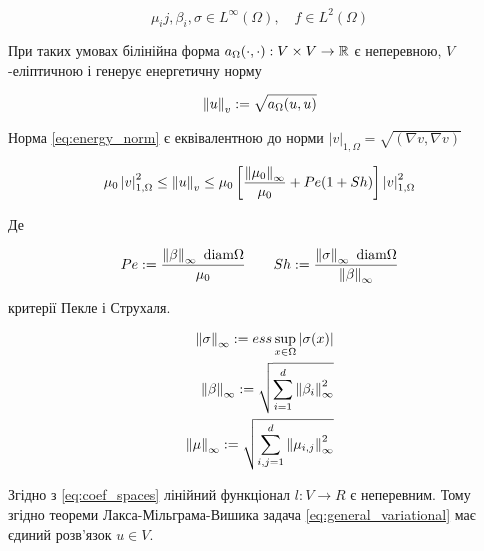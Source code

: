 \begin{equation}\label{eq:coef_spaces}
	\mu_ij, \beta_i, \sigma \in L^\infty(\Omega), \quad f \in L^2(\Omega)
\end{equation}

При таких умовах білінійна форма $a_\Omega (\cdot,\cdot): V \times V  \to \mathbb{R}$ є неперевною, $V$-еліптичною і генерує енергетичну норму

\begin{equation}\label{eq:energy_norm}
	\left\lVert u\right\rVert_v := \sqrt{a_\Omega(u,u)}
\end{equation}

\newcommand{\vonenorm}{\left|v\right|_{1,\Omega}}

Норма \eqref{eq:energy_norm} є еквівалентною до норми $\vonenorm = \sqrt{(\nabla v, \nabla v)}$

\newcommand{\infnorm}[1]{\norm{#1}_\infty}

\begin{equation}\label{eq:norm_equivalence}
	\mu_0 \vonenorm^2 \le \norm{u}_v \le
		\mu_0
			\left[
				\frac{\norm{\mu_0}_\infty}{\mu_0}+Pe(1+Sh)
			\right]
		\vonenorm^2
\end{equation}

Де

\begin{equation}
	Pe:= \frac{\infnorm{\beta} \text{ diam} \Omega}{\mu_0} \qquad
	Sh:= \frac{\infnorm{\sigma} \text{ diam} \Omega}{\infnorm{\beta}}
\end{equation}

критерії Пекле і Струхаля.

\begin{equation}
	\begin{split}
		\infnorm{\sigma} := ess \sup \limits_{x \in \Omega} |\sigma(x)| \\
		\infnorm{\beta} := \sqrt{\sum \limits_{i=1}^d \infnorm{\beta_i}^2} \\
		\infnorm{\mu} := \sqrt{\sum \limits_{i,j=1}^d \infnorm{\mu_{i,j}}^2}
	\end{split}
\end{equation}

\undef{\vonenorm}

Згідно з
\eqref{eq:coef_spaces} лінійний функціонал $l : V \to R$ є неперевним.
Тому згідно теореми Лакса-Мільграма-Вишика задача
\eqref{eq:general_variational} має єдиний розв'язок $u \in V$.
